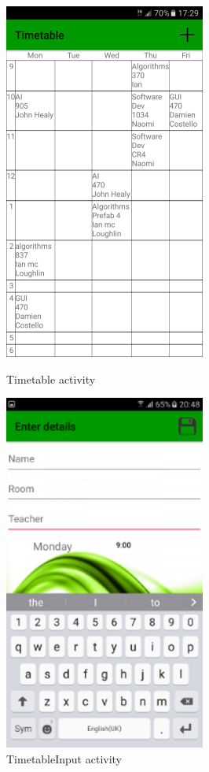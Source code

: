 \begin{figure}[!tbp]
	\begin{minipage}[b]{0.47\textwidth}
		\includegraphics{img/timetable.png}
		\caption{Timetable activity}
	\end{minipage}
	\hfill
	\begin{minipage}[b]{0.47\textwidth}
		\includegraphics{img/timetableinput.png}
		\caption{TimetableInput activity}
	\end{minipage}
\end{figure}

